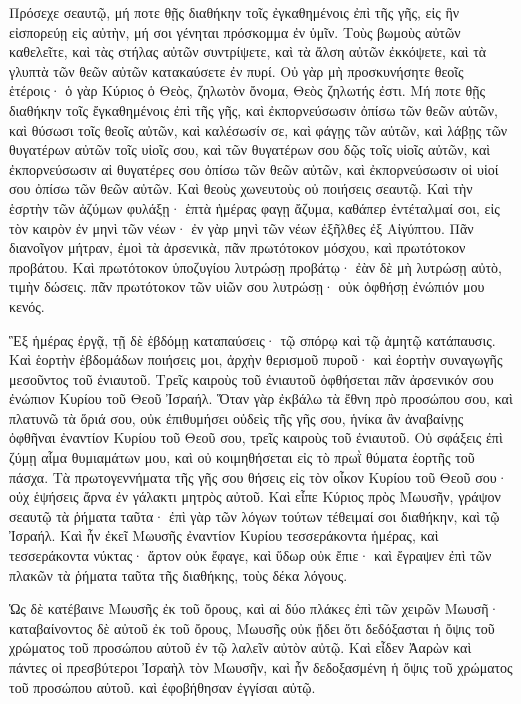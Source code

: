 {Πρόσεχε σεαυτῷ, μή ποτε θῇς διαθήκην τοῖς ἐγκαθημένοις ἐπὶ τῆς γῆς, εἰς ἣν εἰσπορεύῃ εἰς αὐτὴν, μή σοι γένηται πρόσκομμα ἐν ὑμῖν.
Τοὺς βωμοὺς αὐτῶν καθελεῖτε, καὶ τὰς στήλας αὐτῶν συντρίψετε, καὶ τὰ ἄλση αὐτῶν ἐκκόψετε, καὶ τὰ γλυπτὰ τῶν θεῶν αὐτῶν κατακαύσετε ἐν πυρί.
Οὐ γὰρ μὴ προσκυνήσητε θεοῖς ἑτέροις· ὁ γὰρ Κύριος ὁ Θεὸς, ζηλωτὸν ὄνομα, Θεὸς ζηλωτής ἐστι.
Μή ποτε θῇς διαθήκην τοῖς ἔγκαθημένοις ἐπὶ τῆς γῆς, καὶ ἐκπορνεύσωσιν ὀπίσω τῶν θεῶν αὐτῶν, καὶ θύσωσι τοῖς θεοῖς αὐτῶν, καὶ καλέσωσίν σε, καὶ φάγῃς τῶν αὐτῶν,
καὶ λάβῃς τῶν θυγατέρων αὐτῶν τοῖς υἱοῖς σου, καὶ τῶν θυγατέρων σου δῷς τοῖς υἱοῖς αὐτῶν, καὶ ἐκπορνεύσωσιν αἱ θυγατέρες σου ὀπίσω τῶν θεῶν αὐτῶν, καὶ ἐκπορνεύσωσιν οἱ υἱοί σου ὀπίσω τῶν θεῶν αὐτῶν.
Καὶ θεοὺς χωνευτοὺς οὐ ποιήσεις σεαυτῷ.
Καὶ τὴν ἑσρτὴν τῶν ἀζύμων φυλάξῃ· ἑπτὰ ἡμέρας φαγῃ ἄζυμα, καθάπερ ἐντέταλμαί σοι, εἰς τὸν καιρὸν ἐν μηνὶ τῶν νέων· ἐν γὰρ μηνὶ τῶν νέων ἐξῆλθες ἐξ Αἰγύπτου.
Πᾶν διανοῖγον μήτραν, ἐμοὶ τὰ ἀρσενικὰ, πᾶν πρωτότοκον μόσχου, καὶ πρωτότοκον προβάτου.
Καὶ πρωτότοκον ὑποζυγίου λυτρώσῃ προβάτῳ· ἐὰν δὲ μὴ λυτρώσῃ αὐτὸ, τιμὴν δώσεις. πᾶν πρωτότοκον τῶν υἱῶν σου λυτρώσῃ· οὐκ ὀφθήσῃ ἐνώπιόν μου κενός.
\par }{\PP {}Ἓξ ἡμέρας ἐργᾷ, τῇ δὲ ἑβδόμῃ καταπαύσεις· τῷ σπόρῳ καὶ τῷ ἀμητῷ κατάπαυσις.
Καὶ ἑορτὴν ἑβδομάδων ποιήσεις μοι, ἀρχὴν θερισμοῦ πυροῦ· καὶ ἐορτὴν συναγωγῆς μεσοῦντος τοῦ ἐνιαυτοῦ.
Τρεῖς καιροὺς τοῦ ἐνιαυτοῦ ὀφθήσεται πᾶν ἀρσενικόν σου ἐνώπιον Κυρίου τοῦ Θεοῦ Ἰσραήλ.
Ὅταν γὰρ ἐκβάλω τὰ ἔθνη πρὸ προσώπου σου, καὶ πλατυνῶ τὰ ὅριά σου, οὐκ ἐπιθυμήσει οὐδεὶς τῆς γῆς σου, ἡνίκα ἂν ἀναβαίνῃς ὀφθῆναι ἐναντίον Κυρίου τοῦ Θεοῦ σου, τρεῖς καιροὺς τοῦ ἐνιαυτοῦ.
Οὐ σφάξεις ἐπὶ ζύμῃ αἷμα θυμιαμάτων μου, καὶ οὐ κοιμηθήσεται εἰς τὸ πρωῒ θύματα ἑορτῆς τοῦ πάσχα.
Τὰ πρωτογεννήματα τῆς γῆς σου θήσεις εἰς τὸν οἶκον Κυρίου τοῦ Θεοῦ σου· οὐχ ἑψήσεις ἄρνα ἐν γάλακτι μητρὸς αὐτοῦ.
Καὶ εἶπε Κύριος πρὸς Μωυσῆν, γράψον σεαυτῷ τὰ ῥήματα ταῦτα· ἐπὶ γὰρ τῶν λόγων τούτων τέθειμαί σοι διαθήκην, καὶ τῷ Ἰσραήλ.
Καὶ ἦν ἐκεῖ Μωυσῆς ἐναντίον Κυρίου τεσσεράκοντα ἡμέρας, καὶ τεσσεράκοντα νύκτας· ἄρτον οὐκ ἔφαγε, καὶ ὕδωρ οὐκ ἔπιε· καὶ ἔγραψεν ἐπὶ τῶν πλακῶν τὰ ῥήματα ταῦτα τῆς διαθήκης, τοὺς δέκα λόγους.
\par }{\PP {}Ὡς δὲ κατέβαινε Μωυσῆς ἐκ τοῦ ὄρους, καὶ αἱ δύο πλάκες ἐπὶ τῶν χειρῶν Μωυσῆ· καταβαίνοντος δὲ αὐτοῦ ἐκ τοῦ ὄρους, Μωυσῆς οὐκ ᾔδει ὅτι δεδόξασται ἡ ὄψις τοῦ χρώματος τοῦ προσώπου αὐτοῦ ἐν τῷ λαλεῖν αὐτὸν αὐτῷ.
Καὶ εἶδεν Ἀαρὼν καὶ πάντες οἱ πρεσβύτεροι Ἰσραὴλ τὸν Μωυσῆν, καὶ ἦν δεδοξασμένη ἡ ὄψις τοῦ χρώματος τοῦ προσώπου αὐτοῦ. καὶ ἐφοβήθησαν ἐγγίσαι αὐτῷ.
}
